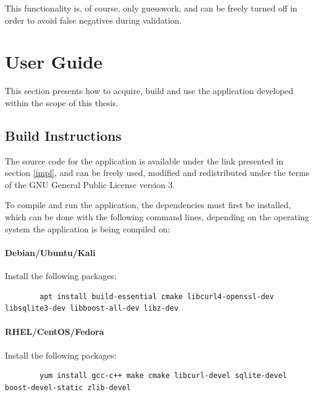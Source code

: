 \documentclass[a4paper,12pt]{article}
\begin{document}
	This functionality is, of course, only guesswork, and can be freely turned off in order to avoid false negatives during validation.

\section{User Guide}
 

	This section presents how to acquire, build and use the application developed within the scope of this thesis.
	
\subsection{Build Instructions}
 
	
	The source code for the application is available under the link presented in section \ref{impl}, and can be freely used, modified and redistributed under the terms of the GNU General Public License version 3\cite{gplv3}.
	
	To compile and run the application, the dependencies must first be installed, which can be done with the following command lines, depending on the operating system the application is being compiled on:
	
	\vspace{-0.1in}
	\paragraph*{Debian/Ubuntu/Kali} Install the following packages:
	
	\begin{listing}[H]
	\begin{verbatim}
		apt install build-essential cmake libcurl4-openssl-dev libsqlite3-dev libboost-all-dev libz-dev
	\end{verbatim}
	\end{listing}
		
	\vspace{-0.4in}
	\paragraph*{RHEL/CentOS/Fedora} Install the following packages:
	
	\begin{listing}[H]
	\begin{verbatim}
		yum install gcc-c++ make cmake libcurl-devel sqlite-devel boost-devel-static zlib-devel
	\end{verbatim}
	\end{listing}
		
\end{document}
